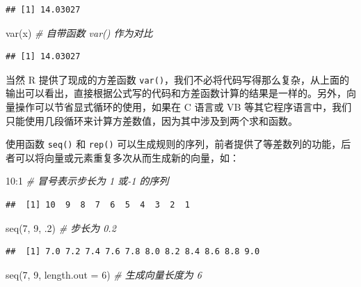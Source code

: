 \documentclass[
  b5paper,
  UTF8,twoside]{book}
\newenvironment{Shaded}{\begin{snugshade}}{\end{snugshade}}
\newcommand{\AttributeTok}[1]{\textcolor[rgb]{0.77,0.63,0.00}{#1}}
\newcommand{\CommentTok}[1]{\textcolor[rgb]{0.56,0.35,0.01}{\textit{#1}}}
\newcommand{\DecValTok}[1]{\textcolor[rgb]{0.00,0.00,0.81}{#1}}
\newcommand{\FunctionTok}[1]{\textcolor[rgb]{0.00,0.00,0.00}{#1}}
\newcommand{\NormalTok}[1]{#1}
\newcommand{\SpecialCharTok}[1]{\textcolor[rgb]{0.00,0.00,0.00}{#1}}
\begin{document}
\begin{verbatim}
## [1] 14.03027
\end{verbatim}

\begin{Shaded}
\begin{Highlighting}[]
\FunctionTok{var}\NormalTok{(x) }\CommentTok{\# 自带函数 var() 作为对比}
\end{Highlighting}
\end{Shaded}

\begin{verbatim}
## [1] 14.03027
\end{verbatim}

当然 R 提供了现成的方差函数 \texttt{var()}，我们不必将代码写得那么复杂，从上面的输出可以看出，直接根据公式写的代码和方差函数计算的结果是一样的。另外，向量操作可以节省显式循环的使用，如果在 C 语言或 VB 等其它程序语言中，我们只能使用几段循环来计算方差数值，因为其中涉及到两个求和函数。

使用函数 \texttt{seq()} 和 \texttt{rep()} 可以生成规则的序列，前者提供了等差数列的功能，后者可以将向量或元素重复多次从而生成新的向量，如：

\begin{Shaded}
\begin{Highlighting}[]
\DecValTok{10}\SpecialCharTok{:}\DecValTok{1} \CommentTok{\# 冒号表示步长为 1 或{-}1 的序列}
\end{Highlighting}
\end{Shaded}

\begin{verbatim}
##  [1] 10  9  8  7  6  5  4  3  2  1
\end{verbatim}

\begin{Shaded}
\begin{Highlighting}[]
\FunctionTok{seq}\NormalTok{(}\DecValTok{7}\NormalTok{, }\DecValTok{9}\NormalTok{, .}\DecValTok{2}\NormalTok{) }\CommentTok{\# 步长为 0.2}
\end{Highlighting}
\end{Shaded}

\begin{verbatim}
##  [1] 7.0 7.2 7.4 7.6 7.8 8.0 8.2 8.4 8.6 8.8 9.0
\end{verbatim}

\begin{Shaded}
\begin{Highlighting}[]
\FunctionTok{seq}\NormalTok{(}\DecValTok{7}\NormalTok{, }\DecValTok{9}\NormalTok{, }\AttributeTok{length.out =} \DecValTok{6}\NormalTok{) }\CommentTok{\# 生成向量长度为 6}
\end{Highlighting}
\end{Shaded}
\end{document}
